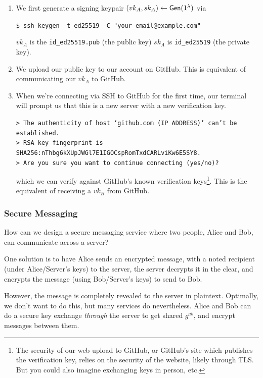 \begin{enumerate}
    \item We first generate a signing keypair $(vk_A, sk_A) \leftarrow \operatorname{\mathsf{Gen}}(1^\lambda)$ via

          \texttt{\$ ssh-keygen -t ed25519 -C "your\_email@example.com"}

          $vk_A$ is the \texttt{id\_ed25519.pub} (the public key) $sk_A$ is \texttt{id\_ed25519} (the private key).
    \item We upload our public key to our account on GitHub. This is equivalent of communicating our $vk_A$ to GitHub.
    \item When we're connecting via SSH to GitHub for the first time, our terminal will prompt us that this is a new server with a new verification key.

          \texttt{> The authenticity of host `github.com (IP ADDRESS)' can't be established. \\
              > RSA key fingerprint is SHA256:nThbg6kXUpJWGl7E1IGOCspRomTxdCARLviKw6E5SY8. \\
              > Are you sure you want to continue connecting (yes/no)?}

          which we can verify against GitHub's known verification keys\footnote{The security of our web upload to GitHub, or GitHub's site which publishes the verification key, relies on the security of the website, likely through TLS. But you could also imagine exchanging keys in person, etc. }. This is the equivalent of receiving a $vk_B$ from GitHub.
\end{enumerate}

\subsubsection{Secure Messaging}\label{sec:feb23-secure-messaging}
How can we design a secure messaging service where two people, Alice and Bob, can communicate across a server?

One solution is to have Alice sends an encrypted message, with a noted recipient (under Alice/Server's keys) to the server, the server decrypts it in the clear, and encrypts the message (using Bob/Server's keys) to send to Bob.

However, the message is completely revealed to the server in plaintext. Optimally, we don't want to do this, but many services do nevertheless. Alice and Bob can do a secure key exchange \emph{through} the server to get shared $g^{ab}$, and encrypt messages between them.

